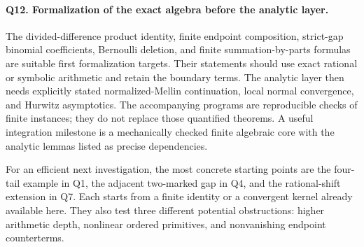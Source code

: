 \paragraph{Q12. Formalization of the exact algebra before the analytic layer.}
The divided-difference product identity, finite endpoint composition,
strict-gap binomial coefficients, Bernoulli deletion, and finite
summation-by-parts formulas are suitable first formalization targets.
Their statements should use exact rational or symbolic arithmetic and
retain the boundary terms. The analytic layer then needs explicitly
stated normalized-Mellin continuation, local normal convergence,
and Hurwitz asymptotics. The accompanying programs are reproducible
checks of finite instances; they do not replace those quantified
theorems. A useful integration milestone is a mechanically checked
finite algebraic core with the analytic lemmas listed as precise
dependencies.

\medskip
For an efficient next investigation, the most concrete starting points
are the four-tail example in Q1, the adjacent two-marked gap in Q4,
and the rational-shift extension in Q7. Each starts from a finite
identity or a convergent kernel already available here. They also test
three different potential obstructions: higher arithmetic depth,
nonlinear ordered primitives, and nonvanishing endpoint counterterms.
